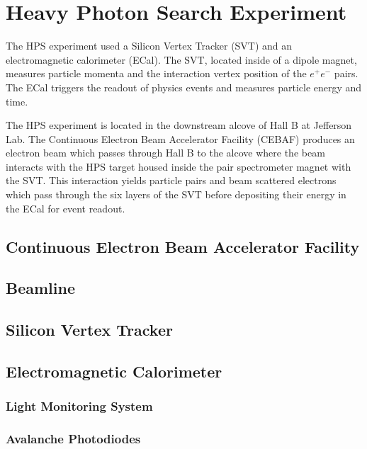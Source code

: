 \documentclass[12pt]{report}
\begin{document}
\chapter{Heavy Photon Search Experiment}
The HPS experiment used a Silicon Vertex Tracker (SVT) and an electromagnetic calorimeter (ECal). The SVT, located inside of a dipole magnet, measures particle momenta and the interaction vertex position of the $e^+e^-$ pairs. The ECal triggers the readout of physics events and measures particle energy and time. \par
The HPS experiment is located in the downstream alcove of Hall B at Jefferson Lab. The Continuous Electron Beam Accelerator Facility (CEBAF) produces an electron beam which passes through Hall B to the alcove where the beam interacts with the HPS target housed inside the pair spectrometer magnet with the SVT. This interaction yields particle pairs and beam scattered electrons which pass through the six layers of the SVT before depositing their energy in the ECal for event readout.

\section{Continuous Electron Beam Accelerator Facility}


\section{Beamline}


\section{Silicon Vertex Tracker}


\section{Electromagnetic Calorimeter}


\subsection{Light Monitoring System}


\subsection{Avalanche Photodiodes}

\end{document}
